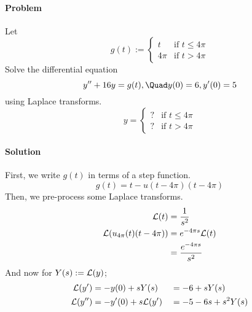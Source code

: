 \newpage\paragraph{Problem}
Let
$$
	g(t):=\begin{cases}
		t    & \text{if }t\leq4\pi \\
		4\pi & \text{if }t>4\pi
	\end{cases}
$$
Solve the differential equation
$$
	y'' + 16y = g(t),\Quad y(0)=6,y'(0)=5
$$
using Laplace transforms.
$$
	y=\begin{cases}
		? & \text{if }t\leq4\pi \\
		? & \text{if }t>4\pi
	\end{cases}
$$

\paragraph{Solution}

First, we write $g(t)$ in terms of a step function.
$$
	g(t) = t - u(t-4\pi)(t-4\pi)
$$
Then, we pre-process some Laplace transforms.
\begin{align}
	\mathcal L(t)                   & = \frac1{s^2}             \\
	\mathcal L(u_{4\pi}(t)(t-4\pi)) & = e^{-4\pi s}\mathcal L(t)        \\
	                        & = \frac{e^{-4\pi s}}{s^2}
\end{align}
And now for $Y(s):=\mathcal L(y)$;
\begin{alignat*}{2}
	\mathcal L(y')  & = -y(0)+sY(s)    &  & = -6+sY(s)      \\
	\mathcal L(y'') & = -y'(0)+s\mathcal L(y') &  & = -5-6s+s^2Y(s) \\
\end{alignat*}

